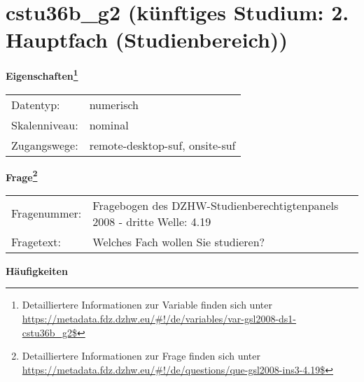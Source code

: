
    \setcounter{footnote}{0}

    \vspace*{-1.8cm}
	\section{cstu36b\_g2 (künftiges Studium: 2. Hauptfach (Studienbereich))}
	\label{section:cstu36b_g2}



    \vspace*{0.5cm}
    \noindent\textbf{Eigenschaften\footnote{Detailliertere Informationen zur Variable finden sich unter
		\url{https://metadata.fdz.dzhw.eu/\#!/de/variables/var-gsl2008-ds1-cstu36b_g2$}}}\\
	\begin{tabularx}{\hsize}{@{}lX}
	Datentyp: & numerisch \\
	Skalenniveau: & nominal \\
	Zugangswege: &
	  remote-desktop-suf, 
	  onsite-suf
 \\
    \end{tabularx}



				\vspace*{0.5cm}
                \noindent\textbf{Frage\footnote{Detailliertere Informationen zur Frage finden sich unter
		              \url{https://metadata.fdz.dzhw.eu/\#!/de/questions/que-gsl2008-ins3-4.19$}}}\\
				\begin{tabularx}{\hsize}{@{}lX}
					Fragenummer: &
					  Fragebogen des DZHW-Studienberechtigtenpanels 2008 - dritte Welle:
					  4.19
 \\
					Fragetext: & Welches Fach wollen Sie studieren? \\
				\end{tabularx}





        		\vspace*{0.5cm}
                \noindent\textbf{Häufigkeiten}


